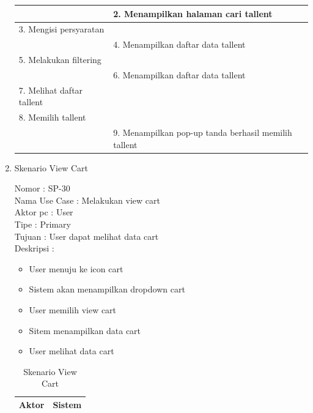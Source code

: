 \begin{enumerate}
\begin{table}
\begin{tabular}{ | l | p{60mm}|}
		&  2.	Menampilkan halaman cari tallent \\
		
		\hline
		
		3. Mengisi persyaratan & \\
		
		\hline
		
		& 4. Menampilkan daftar data tallent \\
		\hline
		
		5. Melakukan filtering & \\
		\hline
		
		& 6. Menampilkan daftar data tallent \\
		\hline
		
		7. Melihat daftar tallent & \\
		\hline
		
		8. Memilih tallent & \\
		\hline
		
		& 9. Menampilkan pop-up tanda berhasil memilih tallent \\
		\hline
		
	\end{tabular}
\end{table}

\item Skenario View Cart

Nomor \kern 3.6pc : SP-30 \\
Nama Use Case : Melakukan view cart \\
Aktor  pc : User \\
Tipe \kern 4.6pc : Primary \\
Tujuan \kern 3.6pc : User dapat melihat data cart \\
Deskripsi \kern 2.5pc : 

\begin{itemize}
	\item User menuju ke icon cart
	\item Sistem akan menampilkan dropdown cart
	\item User memilih view cart
	\item Sitem menampilkan data cart
	\item User melihat data cart

	
\end{itemize}

\begin{table}
	\caption{Skenario View Cart}
	\centering
	\begin{tabular}{ | l | p{70mm}|}
		\hline 
		\textbf{Aktor} & \textbf{Sistem} \\
		\hline
		

\end{tabular}
\end{table}
\end{enumerate}
